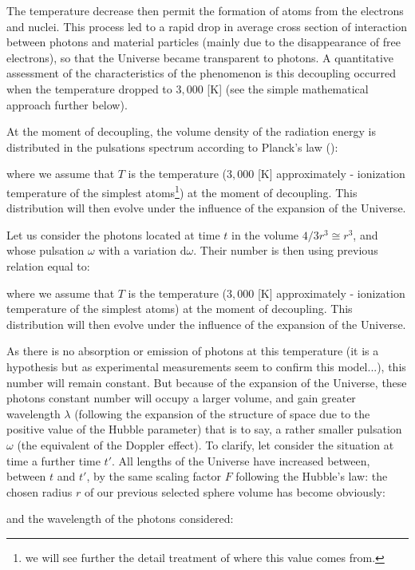 	The temperature decrease then permit the formation of atoms from the electrons and nuclei. This process led to a rapid drop in average cross section of interaction between photons and material particles (mainly due to the disappearance of free electrons), so that the Universe became transparent to photons. A quantitative assessment of the characteristics of the phenomenon is this decoupling occurred when the temperature dropped to $3,000$ [K] (see the simple mathematical approach further below).

	At the moment of decoupling, the volume density of the radiation energy is distributed in the pulsations spectrum according to Planck's law ():
	
	where we assume that $T$ is the temperature ($3,000$ [K] approximately - ionization temperature of the simplest atoms\footnote{we will see further the detail treatment of where this value comes from.}) at the moment of decoupling. This distribution will then evolve under the influence of the expansion of the Universe.

	Let us consider the photons located at time $t$ in the volume $4/3r^3\cong r^3$, and whose pulsation $\omega$ with a variation $\mathrm{d}\omega$. Their number is then using previous relation equal to:
	
	where we assume that $T$ is the temperature ($3,000$ [K] approximately - ionization temperature of the simplest atoms) at the moment of decoupling. This distribution will then evolve under the influence of the expansion of the Universe.
	
	As there is no absorption or emission of photons at this temperature (it is a hypothesis but as experimental measurements seem to confirm this model...), this number will remain constant. But because of the expansion of the Universe, these photons constant number will occupy a larger volume, and gain greater wavelength $\lambda$ (following the expansion of the structure of space due to the positive value of the Hubble parameter) that is to say, a rather smaller pulsation $\omega$ (the equivalent of the Doppler effect). To clarify, let consider the situation at time a further time $t'$. All lengths of the Universe have increased between, between $t$ and $t'$, by the same scaling factor $F$ following the Hubble's law: the chosen radius $r$ of our previous selected sphere volume has become obviously:
	
	and the wavelength of the photons considered:
	
